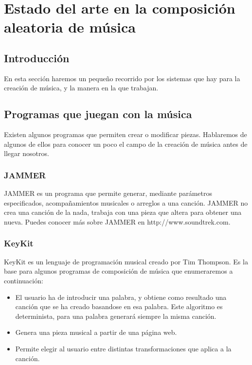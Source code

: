 \chapter{Estado del arte en la composici\'on aleatoria de m\'usica}
\section{Introducci\'on}

En esta secci\'on haremos un peque\~no recorrido por los sistemas que hay para la creaci\'on de m\'usica, y la manera en la que trabajan.

\section{Programas que juegan con la m\'usica}

Existen algunos programas que permiten crear o modificar  piezas. Hablaremos de algunos de ellos para conocer un poco el campo de la creaci\'on de m\'usica antes de llegar nosotros.

\subsection{JAMMER}

JAMMER es un programa que permite generar, mediante par\'ametros especificados, acompa\~namientos musicales o arreglos a una canci\'on. JAMMER no crea una canci\'on de la nada, trabaja con una pieza que altera para obtener una nueva.
Puedes conocer m\'as sobre JAMMER en http://www.soundtrek.com.

\subsection {KeyKit}

KeyKit es un lenguaje de programaci\'on musical creado por Tim Thompson. Es la base para algunos programas de composici\'on de m\'usica que enumeraremos a continuaci\'on:

\begin {itemize}

\item [Muse-O-Matic] El usuario ha de introducir una palabra, y obtiene como resultado una canci\'on que se ha creado basandose en esa palabra. Este algoritmo es determinista, para una palabra generar\'a siempre la misma canci\'on.
\item [Web Tones] Genera una pieza musical a partir de una p\'agina web. 
\item [Key Chain] Permite elegir al usuario entre distintas transformaciones que aplica a la canci\'on.

\end {itemize}